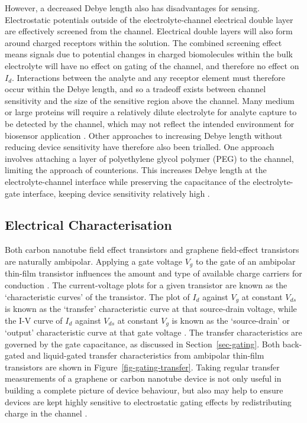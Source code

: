 \documentclass[
  a4paper,
]{scrbook}
\begin{document}
However, a decreased Debye length also has disadvantages for sensing.
Electrostatic potentials outside of the electrolyte-channel electrical
double layer are effectively screened from the channel. Electrical
double layers will also form around charged receptors within the
solution. The combined screening effect means signals due to potential
changes in charged biomolecules within the bulk electrolyte will have no
effect on gating of the channel, and therefore no effect on \(I_d\).
Interactions between the analyte and any receptor element must therefore
occur within the Debye length, and so a tradeoff exists between channel
sensitivity and the size of the sensitive region above the channel. Many
medium or large proteins will require a relatively dilute electrolyte
for analyte capture to be detected by the channel, which may not reflect
the intended environment for biosensor application
\autocite{Stern2007,Piccinini2018,Shkodra2021}. Other approaches to
increasing Debye length without reducing device sensitivity have
therefore also been trialled. One approach involves attaching a layer of
polyethylene glycol polymer (PEG) to the channel, limiting the approach
of counterions. This increases Debye length at the electrolyte-channel
interface while preserving the capacitance of the electrolyte-gate
interface, keeping device sensitivity relatively high
\autocite{Gao2016,Kesler2020,Albarghouthi2022}.

\hypertarget{electrical-characterisation}{%
\subsection{Electrical
Characterisation}\label{electrical-characterisation}}

Both carbon nanotube field effect transistors and graphene field-effect
transistors are naturally ambipolar. Applying a gate voltage \(V_g\) to
the gate of an ambipolar thin-film transistor influences the amount and
type of available charge carriers for conduction
\autocite{Avouris2007,Tran2016,Heller2009a}. The current-voltage plots
for a given transistor are known as the `characteristic curves' of the
transistor. The plot of \(I_d\) against \(V_g\) at constant \(V_{ds}\)
is known as the `transfer' characteristic curve at that source-drain
voltage, while the I-V curve of \(I_d\) against \(V_{ds}\) at constant
\(V_g\) is known as the `source-drain' or `output' characteristic curve
at that gate voltage \autocite{Petti2016,Shkodra2021}. The transfer
characteristics are governed by the gate capacitance, as discussed in
Section~\ref{sec-gating}. Both back-gated and liquid-gated transfer
characteristics from ambipolar thin-film transistors are shown in
Figure~\ref{fig-gating-transfer}. Taking regular transfer measurements
of a graphene or carbon nanotube device is not only useful in building a
complete picture of device behaviour, but also may help to ensure
devices are kept highly sensitive to electrostatic gating effects by
redistributing charge in the channel \autocite{Kireev2017,Noyce2019}.
\end{document}
